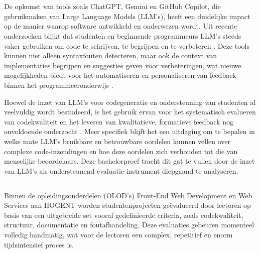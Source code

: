 
\chapter{}%
\label{ch:inleiding}

De opkomst van tools zoals ChatGPT, Gemini en GitHub Copilot, die gebruikmaken van Large Language Models (LLM’s), heeft een duidelijke impact op de manier waarop software ontwikkeld en onderwezen wordt. Uit recente onderzoeken blijkt dat studenten en beginnende programmeurs LLM’s steeds vaker gebruiken om code te schrijven, te begrijpen en te verbeteren \autocite{Lepp2025,Kazemitabaar2023}. Deze tools kunnen niet alleen syntaxfouten detecteren, maar ook de context van implementaties begrijpen en suggesties geven voor verbeteringen, wat nieuwe mogelijkheden biedt voor het automatiseren en personaliseren van feedback binnen het programmeeronderwijs \autocite{Kasneci2023}.

\vspace{1em}

Hoewel de inzet van LLM's voor codegeneratie en ondersteuning van studenten al veelvuldig wordt bestudeerd, is het gebruik ervan voor het systematisch evalueren van codekwaliteit en het leveren van kwalitatieve, formatieve feedback nog onvoldoende onderzocht \autocite{Mendonca2025,Koutcheme2025}. Meer specifiek blijft het een uitdaging om te bepalen in welke mate LLM's bruikbare en betrouwbare oordelen kunnen vellen over complexe code-inzendingen en hoe deze oordelen zich verhouden tot die van menselijke beoordelaars. Deze bachelorproef tracht dit gat te vullen door de inzet van LLM's als ondersteunend evaluatie-instrument diepgaand te analyseren.

\section{}%
\label{sec:probleemstelling}

Binnen de opleidingsonderdelen (OLOD's) Front-End Web Development en Web Services aan HOGENT worden studentenprojecten geëvalueerd door lectoren op basis van een uitgebreide set vooraf gedefinieerde criteria, zoals codekwaliteit, structuur, documentatie en foutafhandeling. Deze evaluaties gebeuren momenteel volledig handmatig, wat voor de lectoren een complex, repetitief en enorm tijdsintensief proces is.

